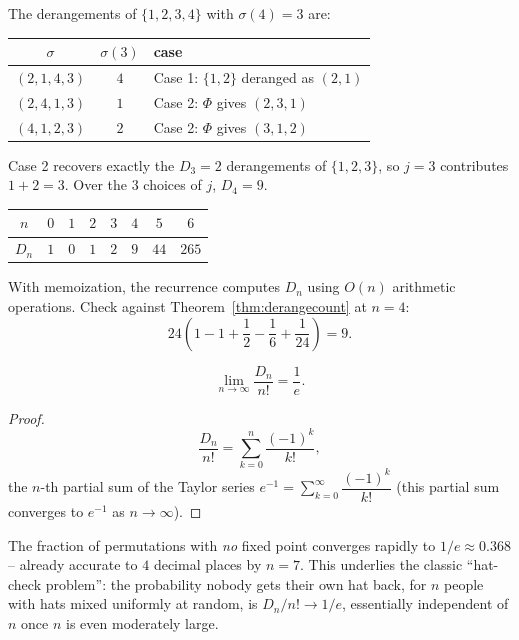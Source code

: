 \begin{example}[The two cases for $n=4$, $j=3$]
The derangements of $\{1,2,3,4\}$ with $\sigma(4)=3$ are:
\begin{center}
\begin{tabular}{c|c|l}
$\sigma$ & $\sigma(3)$ & case \\ \hline
$(2,1,4,3)$ & $4$ & Case 1: $\{1,2\}$ deranged as $(2,1)$ \\
$(2,4,1,3)$ & $1$ & Case 2: $\Phi$ gives $(2,3,1)$ \\
$(4,1,2,3)$ & $2$ & Case 2: $\Phi$ gives $(3,1,2)$
\end{tabular}
\end{center}
Case 2 recovers exactly the $D_3=2$ derangements of $\{1,2,3\}$, so $j=3$ contributes $1+2=3$. Over the $3$ choices of $j$, $D_4=9$.
\end{example}

\begin{example}
\begin{center}
\begin{tabular}{c|ccccccc}
$n$ & $0$ & $1$ & $2$ & $3$ & $4$ & $5$ & $6$ \\ \hline
$D_n$ & $1$ & $0$ & $1$ & $2$ & $9$ & $44$ & $265$
\end{tabular}
\end{center}
With memoization, the recurrence computes $D_n$ using $O(n)$ arithmetic operations. Check against Theorem~\ref{thm:derangecount} at $n=4$:
\[
24\left(1-1+\frac12-\frac16+\frac1{24}\right)=9.
\]
\end{example}

\begin{corollary}
\[
\lim_{n\to\infty} \frac{D_n}{n!} = \frac{1}{e}.
\]
\end{corollary}
\begin{proof}
\[
\frac{D_n}{n!} = \sum_{k=0}^n \frac{(-1)^k}{k!},
\]
the $n$-th partial sum of the Taylor series $e^{-1}=\sum_{k=0}^\infty \dfrac{(-1)^k}{k!}$ (this partial sum converges to $e^{-1}$ as $n\to\infty$).
\end{proof}

\begin{note}[Interpretation]
The fraction of permutations with \emph{no} fixed point converges rapidly to $1/e\approx0.368$ -- already accurate to $4$ decimal places by $n=7$. This underlies the classic ``hat-check problem'': the probability nobody gets their own hat back, for $n$ people with hats mixed uniformly at random, is $D_n/n!\to1/e$, essentially independent of $n$ once $n$ is even moderately large.
\end{note}

